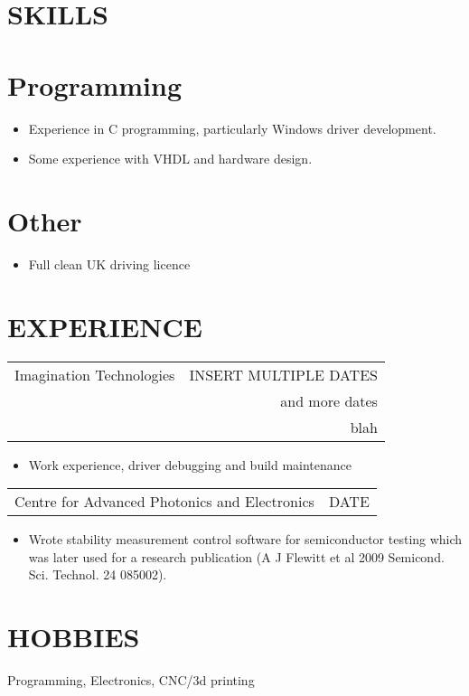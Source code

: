 \documentclass[margin]{res}
\begin{document}
\begin{resume}
\section{SKILLS} 

\normalsize{\section{Programming}}
	\begin{itemize} \itemsep -2pt
		\item Experience in C programming, particularly Windows driver development.
		\item Some experience with VHDL and hardware design.
	\end{itemize}

\normalsize{\section{Other}} 
                  \begin{itemize} \itemsep -2pt
                  \item Full clean UK driving licence 
                  \end{itemize} 
 
\section{EXPERIENCE}      
                  \begin{tabular}{p{3in} r} %
                  Imagination Technologies &  INSERT MULTIPLE DATES \\
                  & and more dates\\
                  & blah
                  \end{tabular}	
                   \begin{itemize} %
                    \item[] Work experience, driver debugging and build maintenance 
		   \end{itemize} 
		 \begin{tabular}{p{3in} r}
                  Centre for Advanced Photonics and Electronics & DATE
                 \end{tabular}	
		  \begin{itemize}
                   \item[] Wrote stability measurement control software for semiconductor testing which
                   was later used for a research publication (A J Flewitt et al 2009 Semicond. Sci. Technol. 24 085002).
                  \end{itemize}
                
 
\section{HOBBIES}         Programming, Electronics, CNC/3d printing 
 
\end{resume} 
\end{document}
